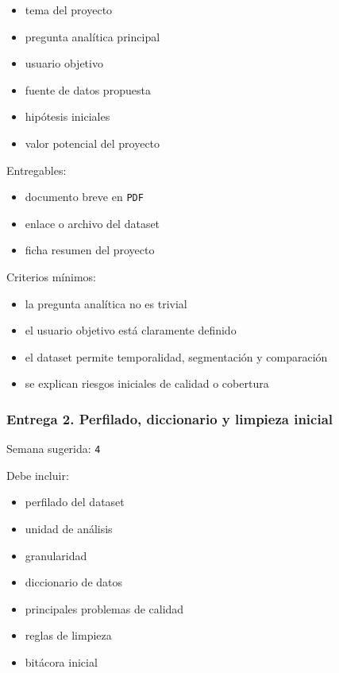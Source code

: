 \documentclass[
]{article}
\providecommand{\tightlist}{%
  \setlength{\itemsep}{0pt}\setlength{\parskip}{0pt}}
\begin{document}
\begin{itemize}
\tightlist
\item
  tema del proyecto
\item
  pregunta analítica principal
\item
  usuario objetivo
\item
  fuente de datos propuesta
\item
  hipótesis iniciales
\item
  valor potencial del proyecto
\end{itemize}

Entregables:

\begin{itemize}
\tightlist
\item
  documento breve en \texttt{PDF}
\item
  enlace o archivo del dataset
\item
  ficha resumen del proyecto
\end{itemize}

Criterios mínimos:

\begin{itemize}
\tightlist
\item
  la pregunta analítica no es trivial
\item
  el usuario objetivo está claramente definido
\item
  el dataset permite temporalidad, segmentación y comparación
\item
  se explican riesgos iniciales de calidad o cobertura
\end{itemize}

\subsubsection{Entrega 2. Perfilado, diccionario y limpieza
inicial}\label{entrega-2-perfilado-diccionario-y-limpieza-inicial}

Semana sugerida: \texttt{4}

Debe incluir:

\begin{itemize}
\tightlist
\item
  perfilado del dataset
\item
  unidad de análisis
\item
  granularidad
\item
  diccionario de datos
\item
  principales problemas de calidad
\item
  reglas de limpieza
\item
  bitácora inicial
\end{itemize}
\end{document}
